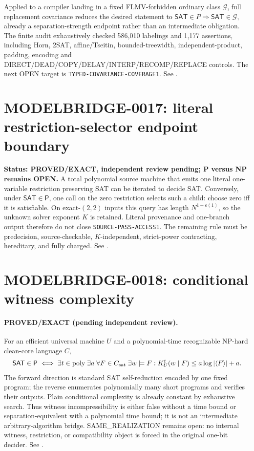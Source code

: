 \documentclass[11pt]{article}
\newcommand{\SAT}{\mathsf{SAT}}
\begin{document}
Applied to a compiler landing in a fixed FLMV-forbidden ordinary class
\(\mathcal G\), full replacement covariance reduces the desired statement to
\(\SAT\in P\Rightarrow\SAT\in\mathcal G\), already a
separation-strength endpoint rather than an intermediate obligation. The
finite audit exhaustively checked 586,010 labelings and 1,177 assertions,
including Horn, 2SAT, affine/Tseitin, bounded-treewidth, independent-product,
padding, encoding and DIRECT/DEAD/COPY/DELAY/INTERP/RECOMP/REPLACE controls.
The next OPEN target is \texttt{TYPED-COVARIANCE-COVERAGE1}.
See .



\section{MODELBRIDGE-0017: literal restriction-selector endpoint boundary}
\textbf{Status: PROVED/EXACT, independent review pending; P versus NP remains OPEN.}
A total polynomial source machine that emits one literal one-variable restriction preserving SAT can be iterated to decide SAT. Conversely, under $\SAT\in\mathsf P$, one call on the zero restriction selects such a child: choose zero iff it is satisfiable. On exact-$(2,2)$ inputs this query has length $N^{1-o(1)}$, so the unknown solver exponent $K$ is retained. Literal provenance and one-branch output therefore do not close \texttt{SOURCE-PASS-ACCESS1}. The remaining rule must be predecision, source-checkable, $K$-independent, strict-power contracting, hereditary, and fully charged. See .


\section{MODELBRIDGE-0018: conditional witness complexity}
\paragraph{PROVED/EXACT (pending independent review).}
For an efficient universal machine $U$ and a polynomial-time recognizable NP-hard clean-core language $C$,
\[
\mathsf{SAT}\in\mathsf P\iff\exists t\in\mathrm{poly}\;\exists a\;\forall F\in C_{\rm sat}\;\exists w\models F:
K_U^t(w\mid F)\le a\log |\langle F\rangle|+a.
\]
The forward direction is standard SAT self-reduction encoded by one fixed program; the reverse enumerates polynomially many short programs and verifies their outputs. Plain conditional complexity is already constant by exhaustive search. Thus witness incompressibility is either false without a time bound or separation-equivalent with a polynomial time bound; it is not an intermediate arbitrary-algorithm bridge. SAME\_REALIZATION remains open: no internal witness, restriction, or compatibility object is forced in the original one-bit decider. See .
\end{document}
